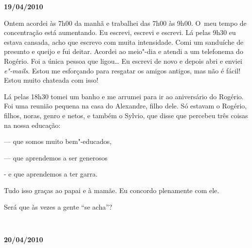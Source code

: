 \begin{flushright}\textbf{19/04/2010}\end{flushright}


Ontem acordei às 7h00 da manhã e trabalhei das 7h00 às 9h00. O~meu tempo
de concentração está aumentando. Eu escrevi, escrevi e escrevi. Lá pelas
9h30 eu estava cansada, acho que escrevo com muita intensidade. Comi um
sanduíche de presunto e queijo e fui deitar. Acordei ao meio"-dia e
atendi a um telefonema do Rogério. Foi a única pessoa que ligou…
Eu escrevi de novo e depois abri e enviei \emph{e"-mails}. Estou me
esforçando para resgatar os amigos antigos, mas não é fácil! Estou muito
chateada com isso!

Lá pelas 18h30 tomei um banho e me arrumei para ir ao aniversário do
Rogério. Foi uma reunião pequena na casa do Alexandre, filho dele. Só
estavam o Rogério, filhos, noras, genro e netos, e também o Sylvio, que
disse que percebeu três coisas na nossa educação:

--- que somos muito bem"-educados,

--- que aprendemos a ser generosos

- e que aprendemos a ter garra.

Tudo isso graças ao papai e à mamãe. Eu concordo plenamente com ele.

Será que às vezes a gente ``se acha''?

\begin{center}\asterisc{}​\end{center}

\begin{flushright}\textbf{}\end{flushright}

\begin{flushright}\textbf{20/04/2010}\end{flushright}


